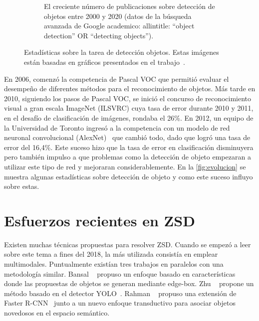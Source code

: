\begin{figure}[]
\begin{subfigure}{0.75\textwidth}
		\caption{El creciente número de publicaciones sobre detección de objetos entre 2000 y 2020 (datos de la búsqueda avanzada de Google academico: allintitle: ``object detection'' OR ``detecting objects'').}
		\label{fig:NMS}
	\end{subfigure}
	\caption{Estadísticas sobre la tarea de detección objetos. Estas imágenes están basadas en gráficos presentados en el trabajo~\cite{zou2019object}.}
	\label{fig:evolucion}
\end{figure}

En 2006, comenzó la competencia de Pascal VOC que permitió evaluar el desempeño de diferentes métodos para el reconocimiento de objetos. Más tarde en 2010, siguiendo los pasos de Pascal VOC, se inició el concurso de reconocimiento visual a gran escala ImageNet (ILSVRC) cuya tasa de error durante 2010 y 2011, en el desafío de clasificación de imágenes, rondaba el 26\%.  En 2012, un equipo de la Universidad de Toronto ingresó a la competencia con un modelo de red neuronal convolucional (AlexNet)~\cite{krizhevsky2012imagenet} que cambió todo, dado que logró una tasa de error del 16,4\%. Este suceso hizo que la tasa de error en clasificación disminuyera pero también impulso a que problemas como la detección de objeto empezaran a utilizar este tipo de red y mejoraran considerablemente. En la \autoref{fig:evolucion} se muestra algunas estadísticas sobre detección de objeto y como este suceso influyo sobre estas.


\section{Esfuerzos recientes en ZSD}\label{sec:esfuerzosrecientesenZSD}

Existen muchas técnicas propuestas para resolver ZSD. Cuando se empezó a leer sobre este tema a fines del 2018, la más utilizada consistía en emplear multimodales. Puntualmente existían tres trabajos en paralelos con una metodología similar. Bansal \etal~\cite{bansal2018zero} propuso un enfoque basado en características donde las propuestas de objetos se generan mediante edge-box. Zhu \etal~\cite{zhu2018zero} propone un método basado en el detector YOLO~\cite{redmon2016you}. Rahman \etal~\cite{rahman2018zero} propuso una extensión de Faster R-CNN~\cite{ren2015faster} junto a un nuevo enfoque transductivo para asociar objetos novedosos en el espacio semántico.\\

